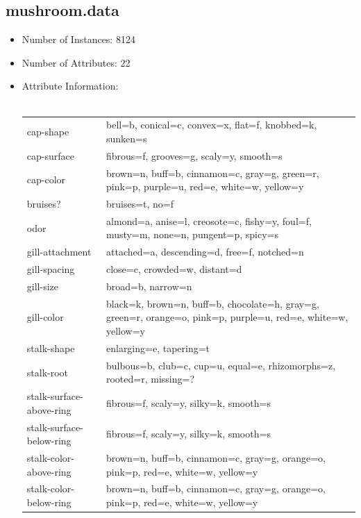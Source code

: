 \documentclass[10pt]{report}
\begin{document}
\subsection*{mushroom.data}
\begin{itemize}
\item Number of Instances: 8124
\item Number of Attributes: 22
\item Attribute Information:
  \\\\
  \begin{left}
    \begin{tabular}{ l p{10cm} }
      cap-shape                 &     bell=b, conical=c, convex=x, flat=f, knobbed=k, sunken=s \\
      cap-surface               &     fibrous=f, grooves=g, scaly=y, smooth=s \\
      cap-color                 &     brown=n, buff=b, cinnamon=c, gray=g, green=r, pink=p, purple=u, red=e, white=w, yellow=y \\
      bruises?                  &     bruises=t, no=f \\
      odor                      &     almond=a, anise=l, creosote=c, fishy=y, foul=f, musty=m, none=n, pungent=p, spicy=s \\
      gill-attachment           &     attached=a, descending=d, free=f, notched=n \\
      gill-spacing              &     close=c, crowded=w, distant=d \\
      gill-size                 &     broad=b, narrow=n \\
      gill-color                &     black=k, brown=n, buff=b, chocolate=h, gray=g, green=r, orange=o, pink=p, purple=u, red=e, white=w, yellow=y \\
      stalk-shape               &     enlarging=e, tapering=t \\
      stalk-root                &     bulbous=b, club=c, cup=u, equal=e, rhizomorphs=z, rooted=r, missing=? \\
      stalk-surface-above-ring  &     fibrous=f, scaly=y, silky=k, smooth=s \\
      stalk-surface-below-ring  &     fibrous=f, scaly=y, silky=k, smooth=s \\
      stalk-color-above-ring    &     brown=n, buff=b, cinnamon=c, gray=g, orange=o, pink=p, red=e, white=w, yellow=y \\
      stalk-color-below-ring    &     brown=n, buff=b, cinnamon=c, gray=g, orange=o, pink=p, red=e, white=w, yellow=y \\

\end{tabular}
\end{left}
\end{itemize}
\end{document}
